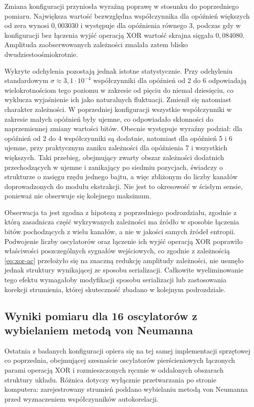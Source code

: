 Zmiana konfiguracji przyniosła wyraźną poprawę w stosunku do poprzedniego pomiaru.
Największa wartość bezwzględna współczynnika dla opóźnień większych od zera wynosi
$0{,}003030$ i występuje dla opóźnienia równego 3, podczas gdy w konfiguracji bez
łączenia wyjść operacją XOR wartość skrajna sięgała $0{,}084080$. Amplituda
zaobserwowanych zależności zmalała zatem blisko dwudziestoośmiokrotnie.

Wykryte odchylenia pozostają jednak istotne statystycznie. Przy odchyleniu standardowym
$\sigma \approx 3{,}1 \cdot 10^{-4}$ współczynniki dla opóźnień od 2 do 6 odpowiadają
wielokrotnościom tego poziomu w zakresie od pięciu do niemal dziesięciu, co wyklucza
wyjaśnienie ich jako naturalnych fluktuacji. Zmienił się natomiast charakter zależności.
W poprzedniej konfiguracji wszystkie współczynniki w zakresie małych opóźnień były
ujemne, co odpowiadało skłonności do naprzemiennej zmiany wartości bitów. Obecnie
występuje wyraźny podział: dla opóźnień od 2 do 4 współczynniki są dodatnie, natomiast
dla opóźnień 5 i 6 ujemne, przy praktycznym zaniku zależności dla opóźnienia 7
i wszystkich większych. Taki przebieg, obejmujący zwarty obszar zależności dodatnich
przechodzących w ujemne i zanikający po siedmiu pozycjach, świadczy o strukturze
o zasięgu rzędu jednego bajtu, a więc zbliżonym do liczby kanałów doprowadzonych do
modułu ekstrakcji. Nie jest to okresowość w ścisłym sensie, ponieważ nie obserwuje się
kolejnego maksimum.

Obserwacja ta jest zgodna z hipotezą z poprzedniego podrozdziału, zgodnie z którą
zasadnicza część wykrywanych zależności ma źródło w sposobie łączenia bitów
pochodzących z wielu kanałów, a nie w jakości samych źródeł entropii. Podwojenie liczby
oscylatorów oraz łączenie ich wyjść operacją XOR poprawiło właściwości poszczególnych
sygnałów wejściowych, co zgodnie z zależnością \eqref{eq:xor-ac} przełożyło się na
znaczną redukcję amplitudy zależności, nie usunęło jednak struktury wynikającej ze
sposobu serializacji. Całkowite wyeliminowanie tego efektu wymagałoby modyfikacji
sposobu serializacji lub zastosowania korekcji strumienia, której skuteczność zbadano
w kolejnym podrozdziale.

\FloatBarrier

\subsection{Wyniki pomiaru dla 16 oscylatorów z wybielaniem metodą von Neumanna}

Ostatnia z badanych konfiguracji opiera się na tej samej implementacji sprzętowej co
poprzednia, obejmującej szesnaście oscylatorów pierścieniowych łączonych parami operacją
XOR i rozmieszczonych ręcznie w oddalonych obszarach struktury układu. Różnica dotyczy
wyłącznie przetwarzania po stronie komputera: zarejestrowany strumień poddano wybielaniu
metodą von Neumanna przed wyznaczeniem współczynników autokorelacji.

